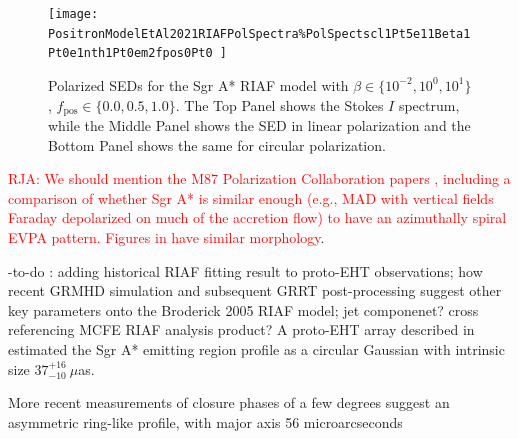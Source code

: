 \begin{figure}%
  \texttt{[image: PositronModelEtAl2021RIAFPolSpectra\%PolSpectscl1Pt5e11Beta1Pt0e1nth1Pt0em2fpos0Pt0
]}
  \caption{Polarized SEDs for the Sgr A* RIAF model with  $\beta\in\{10^{-2},10^{0},10^{1}\}$, $f_\mathrm{pos}\in\{0.0,0.5,1.0\}$. The Top Panel shows the Stokes $I$ spectrum, while the Middle Panel shows the SED in linear polarization and the Bottom Panel shows the same for circular polarization.}
  \label{fig:EmamiRIAFSpectra}
\end{figure}


\textcolor{red}{RJA: We should mention the M87 Polarization Collaboration papers \cite{EHTCPaperVII}, including a comparison of whether Sgr A* is similar enough (e.g., MAD with vertical fields Faraday depolarized on much of the accretion flow) to have an azimuthally spiral EVPA pattern. Figures in  \citep{Emami2021} have similar morphology}.

\hyp{to-do :  adding historical RIAF fitting result to proto-EHT observations; how recent  GRMHD simulation and subsequent GRRT post-processing suggest other key parameters onto the Broderick 2005 RIAF model; jet componenet? cross referencing MCFE RIAF analysis product?} A proto-EHT array described in \cite{Doeleman2008} estimated the Sgr A* emitting region profile as a circular Gaussian with intrinsic size $37^{+16}_{-10}\ \mu$as.


More recent measurements of closure phases of a few degrees \cite{Fish2016} suggest an asymmetric ring-like profile, with major axis 56 microarcseconds

